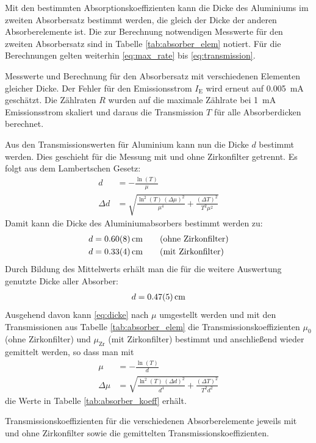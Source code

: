 \documentclass[11pt, a4paper]{article}
\numberwithin{equation}{section}
\begin{document}
Mit den bestimmten Absorptionskoeffizienten kann die Dicke des Aluminiums im zweiten Absorbersatz bestimmt werden, die gleich der Dicke der anderen Absorberelemente ist.
Die zur Berechnung notwendigen Messwerte für den zweiten Absorbersatz sind in Tabelle \ref{tab:absorber_elem} notiert.
Für die Berechnungen gelten weiterhin \eqref{eq:max_rate} bis \eqref{eq:transmission}.
\begin{table}[ht]
	\centering
	\resizebox{\textwidth}{!}{
	
	}
	\caption{Messwerte und Berechnung für den Absorbersatz mit verschiedenen Elementen gleicher Dicke. Der Fehler für den Emissionsstrom $I_\mathrm{E}$ wird erneut auf \SI{0.005}{mA} geschätzt.
	Die Zählraten $R$ wurden auf die maximale Zählrate bei \SI{1}{mA} Emissionsstrom skaliert und daraus die Transmission $T$ für alle Absorberdicken berechnet.}
	\label{tab:absorber_elem}
\end{table}
Aus den Transmissionswerten für Aluminium kann nun die Dicke $d$ bestimmt werden.
Dies geschieht für die Messung mit und ohne Zirkonfilter getrennt.
Es folgt aus dem Lambertschen Gesetz:
\begin{align}
	d&=-\frac{\ln(T)}{\mu} \label{eq:dicke}\\
	\Delta d &= \sqrt{\frac{\ln^2(T)\,(\Delta\mu)^2}{\mu^4} + \frac{(\Delta T)^2}{T^2\mu^2}}
\end{align}
Damit kann die Dicke des Aluminiumabsorbers bestimmt werden zu:
\begin{align*}
d &= \SI{0.60+-0.08}{cm} \qquad\text{(ohne Zirkonfilter)}\\
d &= \SI{0.33+-0.04}{cm} \qquad\text{(mit Zirkonfilter)}
\end{align*}
Durch Bildung des Mittelwerts erhält man die für die weitere Auswertung genutzte Dicke aller Absorber:
\begin{align}
	d = \SI{0.47+-0.05}{cm}
\end{align}
Ausgehend davon kann \eqref{eq:dicke} nach $\mu$ umgestellt werden und mit den Transmissionen aus Tabelle \ref{tab:absorber_elem} die Transmissionskoeffizienten $\mu_0$ (ohne Zirkonfilter) und $\mu_\mathrm{Zr}$ (mit Zirkonfilter) bestimmt und anschließend wieder gemittelt werden, so dass man mit
\begin{align}
	\mu&=-\frac{\ln(T)}{d} \\
	\Delta\mu &= \sqrt{\frac{\ln^2(T)\,(\Delta d)^2}{d^4} + \frac{(\Delta T)^2}{T^2d^2}}
\end{align}
die Werte in Tabelle \ref{tab:absorber_koeff} erhält.
\begin{table}
	\centering
	\resizebox{\textwidth}{!}{
	
	}
	\caption{Transmissionskoeffizienten für die verschiedenen Absorberelemente jeweils mit und ohne Zirkonfilter sowie die gemittelten Transmissionskoeffizienten.}
	\label{tab:absorber_koeff}
\end{table}
\end{document}

